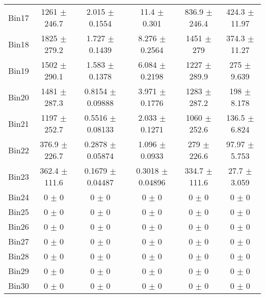 \begin{tabular}{@{\extracolsep{4pt}}lccccc@{}}
     Bin17 & 1261 $\pm$ 246.7 & 2.015 $\pm$ 0.1554 & 11.4 $\pm$ 0.301 & 836.9 $\pm$ 246.4 & 424.3 $\pm$ 11.97 \\ 
     Bin18 & 1825 $\pm$ 279.2 & 1.727 $\pm$ 0.1439 & 8.276 $\pm$ 0.2564 & 1451 $\pm$ 279 & 374.3 $\pm$ 11.27 \\ 
     Bin19 & 1502 $\pm$ 290.1 & 1.583 $\pm$ 0.1378 & 6.084 $\pm$ 0.2198 & 1227 $\pm$ 289.9 & 275 $\pm$ 9.639 \\ 
     Bin20 & 1481 $\pm$ 287.3 & 0.8154 $\pm$ 0.09888 & 3.971 $\pm$ 0.1776 & 1283 $\pm$ 287.2 & 198 $\pm$ 8.178 \\ 
     Bin21 & 1197 $\pm$ 252.7 & 0.5516 $\pm$ 0.08133 & 2.033 $\pm$ 0.1271 & 1060 $\pm$ 252.6 & 136.5 $\pm$ 6.824 \\ 
     Bin22 & 376.9 $\pm$ 226.7 & 0.2878 $\pm$ 0.05874 & 1.096 $\pm$ 0.0933 & 279 $\pm$ 226.6 & 97.97 $\pm$ 5.753 \\ 
     Bin23 & 362.4 $\pm$ 111.6 & 0.1679 $\pm$ 0.04487 & 0.3018 $\pm$ 0.04896 & 334.7 $\pm$ 111.6 & 27.7 $\pm$ 3.059 \\ 
     Bin24 & 0 $\pm$ 0 & 0 $\pm$ 0 & 0 $\pm$ 0 & 0 $\pm$ 0 & 0 $\pm$ 0 \\ 
     Bin25 & 0 $\pm$ 0 & 0 $\pm$ 0 & 0 $\pm$ 0 & 0 $\pm$ 0 & 0 $\pm$ 0 \\ 
     Bin26 & 0 $\pm$ 0 & 0 $\pm$ 0 & 0 $\pm$ 0 & 0 $\pm$ 0 & 0 $\pm$ 0 \\ 
     Bin27 & 0 $\pm$ 0 & 0 $\pm$ 0 & 0 $\pm$ 0 & 0 $\pm$ 0 & 0 $\pm$ 0 \\ 
     Bin28 & 0 $\pm$ 0 & 0 $\pm$ 0 & 0 $\pm$ 0 & 0 $\pm$ 0 & 0 $\pm$ 0 \\ 
     Bin29 & 0 $\pm$ 0 & 0 $\pm$ 0 & 0 $\pm$ 0 & 0 $\pm$ 0 & 0 $\pm$ 0 \\ 
     Bin30 & 0 $\pm$ 0 & 0 $\pm$ 0 & 0 $\pm$ 0 & 0 $\pm$ 0 & 0 $\pm$ 0 \\ 
\hline\hline
  \end{tabular}
